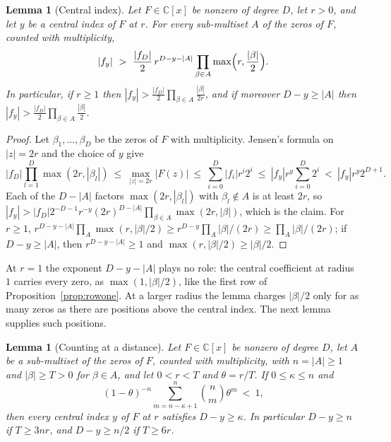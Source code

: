 \documentclass[11pt]{article}
\newtheorem{lemma}[theorem]{Lemma}
\begin{document}
\begin{lemma}[Central index]\label{lem:central}
Let $F\in\mathbb C[x]$ be nonzero of degree $D$, let $r>0$, and let $y$ be a
central index of $F$ at $r$.  For every sub-multiset $A$ of the zeros of $F$,
counted with multiplicity,
\[
  |f_y|\ >\ \frac{|f_D|}2\,r^{D-y-|A|}\prod_{\beta\in A}\max\Bigl(r,\frac{|\beta|}2\Bigr).
\]
In particular, if $r\ge1$ then $|f_y|>\frac{|f_D|}2\prod_{\beta\in A}\frac{|\beta|}{2r}$,
and if moreover $D-y\ge|A|$ then $|f_y|>\frac{|f_D|}2\prod_{\beta\in A}\frac{|\beta|}2$.
\end{lemma}

\begin{proof}
Let $\beta_1,\ldots,\beta_D$ be the zeros of $F$ with multiplicity.  Jensen's
formula on $|z|=2r$ and the choice of $y$ give
\[
  |f_D|\prod_{l=1}^D\max(2r,|\beta_l|)\ \le\ \max_{|z|=2r}|F(z)|
  \ \le\ \sum_{i=0}^D|f_i|r^i2^i\ \le\ |f_y|r^y\sum_{i=0}^D2^i\ <\ |f_y|r^y2^{D+1}.
\]
Each of the $D-|A|$ factors $\max(2r,|\beta_l|)$ with $\beta_l\notin A$ is at
least $2r$, so
$|f_y|>|f_D|2^{-D-1}r^{-y}(2r)^{D-|A|}\prod_{\beta\in A}\max(2r,|\beta|)$,
which is the claim.  For $r\ge1$, $r^{D-y-|A|}\prod_A\max(r,|\beta|/2)\ge
r^{D-y}\prod_A|\beta|/(2r)\ge\prod_A|\beta|/(2r)$; if $D-y\ge|A|$, then
$r^{D-y-|A|}\ge1$ and $\max(r,|\beta|/2)\ge|\beta|/2$.
\end{proof}

At $r=1$ the exponent $D-y-|A|$ plays no role: the central coefficient at
radius $1$ carries every zero, as $\max(1,|\beta|/2)$, like the first row of
Proposition~\ref{prop:rowone}.  At a larger radius the lemma charges
$|\beta|/2$ only for as many zeros as there are positions above the central
index.  The next lemma supplies such positions.

\begin{lemma}[Counting at a distance]\label{lem:tropcount}
Let $F\in\mathbb C[x]$ be nonzero of degree $D$, let $A$ be a sub-multiset of
the zeros of $F$, counted with multiplicity, with $n=|A|\ge1$ and $|\beta|\ge
T>0$ for $\beta\in A$, and let $0<r<T$ and $\theta=r/T$.  If $0\le\kappa\le n$ and
\[
  (1-\theta)^{-n}\sum_{m=n-\kappa+1}^n\binom nm\theta^m\ <\ 1,
\]
then every central index $y$ of $F$ at $r$ satisfies $D-y\ge\kappa$.  In
particular $D-y\ge n$ if $T\ge3nr$, and $D-y\ge n/2$ if $T\ge6r$.
\end{lemma}
\end{document}
